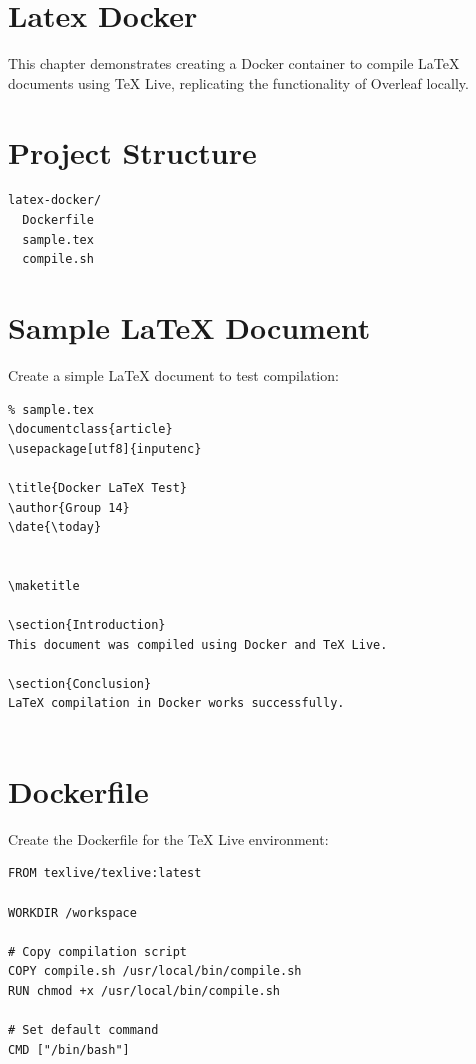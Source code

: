 \section{Latex Docker}
This chapter demonstrates creating a Docker container to compile \LaTeX{} documents using TeX Live, replicating the functionality of Overleaf locally.

\section{Project Structure}
\begin{verbatim}
latex-docker/
  Dockerfile
  sample.tex
  compile.sh
\end{verbatim}

\section{Sample LaTeX Document}
Create a simple \LaTeX{} document to test compilation:

\begin{verbatim}
% sample.tex
\documentclass{article}
\usepackage[utf8]{inputenc}

\title{Docker LaTeX Test}
\author{Group 14}
\date{\today}


\maketitle

\section{Introduction}
This document was compiled using Docker and TeX Live.

\section{Conclusion}
LaTeX compilation in Docker works successfully.


\end{verbatim}

\section{Dockerfile}
Create the Dockerfile for the TeX Live environment:

\begin{verbatim}
FROM texlive/texlive:latest

WORKDIR /workspace

# Copy compilation script
COPY compile.sh /usr/local/bin/compile.sh
RUN chmod +x /usr/local/bin/compile.sh

# Set default command
CMD ["/bin/bash"]
\end{verbatim}

